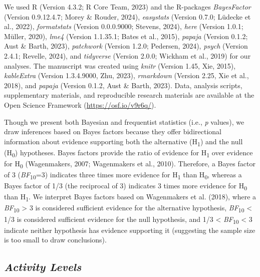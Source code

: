 \documentclass[
  pub]{apa6}
\begin{document}
We used R (Version 4.3.2; R Core Team, 2023) and the R-packages \emph{BayesFactor} (Version 0.9.12.4.7; Morey \& Rouder, 2024), \emph{easystats} (Version 0.7.0; Lüdecke et al., 2022), \emph{formatstats} (Version 0.0.0.9000; Stevens, 2024), \emph{here} (Version 1.0.1; Müller, 2020), \emph{lme4} (Version 1.1.35.1; Bates et al., 2015), \emph{papaja} (Version 0.1.2; Aust \& Barth, 2023), \emph{patchwork} (Version 1.2.0; Pedersen, 2024), \emph{psych} (Version 2.4.1; Revelle, 2024), and \emph{tidyverse} (Version 2.0.0; Wickham et al., 2019) for our analyses. The manuscript was created using \emph{knitr} (Version 1.45, Xie, 2015), \emph{kableExtra} (Version 1.3.4.9000, Zhu, 2023), \emph{rmarkdown} (Version 2.25, Xie et al., 2018), and \emph{papaja} (Version 0.1.2, Aust \& Barth, 2023). Data, analysis scripts, supplementary materials, and reproducible research materials are available at the Open Science Framework (\url{https://osf.io/v9r6q/}).

Though we present both Bayesian and frequentist statistics (i.e., \emph{p} values), we draw inferences based on Bayes factors because they offer bidirectional information about evidence supporting both the alternative (H\textsubscript{1}) and the null (H\textsubscript{0}) hypotheses. Bayes factors provide the ratio of evidence for H\textsubscript{1} over evidence for H\textsubscript{0} (Wagenmakers, 2007; Wagenmakers et al., 2010). Therefore, a Bayes factor of 3 (\emph{BF}\textsubscript{10}=3) indicates three times more evidence for H\textsubscript{1} than H\textsubscript{0}, whereas a Bayes factor of 1/3 (the reciprocal of 3) indicates 3 times more evidence for H\textsubscript{0} than H\textsubscript{1}. We interpret Bayes factors based on Wagenmakers et al. (2018), where a \emph{BF}\textsubscript{10} \textgreater{} 3 is considered sufficient evidence for the alternative hypothesis, \emph{BF}\textsubscript{10} \textless{} 1/3 is considered sufficient evidence for the null hypothesis, and 1/3 \textless{} \emph{BF}\textsubscript{10} \textless{} 3 indicate neither hypothesis has evidence supporting it (suggesting the sample size is too small to draw conclusions).

\hypertarget{activity-levels-1}{%
\subsection{\texorpdfstring{\emph{Activity Levels}}{Activity Levels}}\label{activity-levels-1}}
\end{document}
